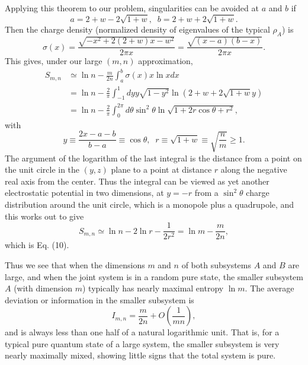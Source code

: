 \documentclass[12pt]{article}
\begin{document}
Applying this theorem to our problem, singularities can be avoided at
$a$ and
$b$ if
	\begin{equation}
        a=2+w-2\sqrt{1+w},\;\;b=2+w+2\sqrt{1+w}.
	\end{equation}
Then the charge density (normalized density of eigenvalues of the
typical
$\rho_A$) is
	\begin{equation}
        \sigma(x)=\frac{\sqrt{-x^2+2(2+w)x-w^2}}{2\pi x}
	=\frac{\sqrt{(x-a)(b-x)}}{2\pi x}.
	\end{equation}
This gives, under our large $(m, n)$ approximation,
	\begin{align}
	S_{m,n} &\simeq \ln n - \frac{m}{2n}\int_a^b\sigma(x)x\ln x
dx\nonumber\\
	&=\ln n - \frac{2}{\pi}\int_{-1}^{1}dy
y\sqrt{1-y^2}\ln(2+w+2\sqrt{1+w}y)
	\nonumber \\&=\ln n - \frac{2}{\pi}
	\int_{0}^{2\pi}d\theta
\sin^2\theta\ln\sqrt{1+2r\cos\theta+r^2},
	\end{align}
with
	\begin{equation}
        y\equiv\frac{2x-a-b}{b-a}\equiv\cos\theta,\;\;
	r\equiv\sqrt{1+w}\equiv\sqrt{\frac{n}{m}}\geq 1.
	\end{equation}
The argument of the logarithm of the last integral is the distance
from a point
on the unit circle in the $(y,z)$ plane to a point at distance $r$
along the
negative real axis from the center.  Thus the integral can be viewed
as yet
another electrostatic potential in two dimensions, at $y=-r$ from a
$\sin^2\theta$ charge distribution around the unit circle, which is a
monopole
plus a quadrupole, and this works out to give
	\begin{equation}
	S_{m,n} \simeq \ln n-2\ln r - \frac{1}{2r^2} = \ln m -
\frac{m}{2n},
	\end{equation}
which is Eq. (10).

Thus we see that when the dimensions $m$ and $n$ of both subsystems
$A$ and $B$
are large, and when the joint system is in a random pure state, the
smaller
subsystem $A$ (with dimension $m$) typically has nearly maximal
entropy $\ln
m$.  The average deviation or information in the smaller subsystem is
	\begin{equation}
	I_{m,n} = \frac{m}{2n} + O(\frac{1}{mn}),
	\end{equation}
and is always less than one half of a natural logarithmic unit.  That
is, for a typical pure quantum state of a large system, the smaller
subsystem
is very nearly maximally mixed, showing little signs that the total
system is
pure.
\end{document}

